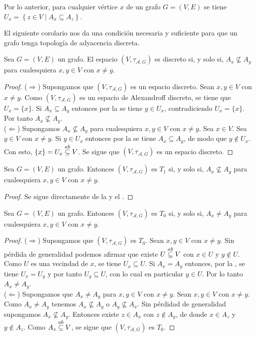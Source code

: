 \begin{Obs}\label{Obs:U_x}
   Por lo anterior, para cualquier vértice $x$ de un grafo $G=(V,E)$ se tiene $U_x=\left\lbrace z\in V\mid A_x\subseteq A_z\right\rbrace$.
\end{Obs}
El siguiente corolario nos da una condición necesaria y suficiente para que un grafo tenga topología de adyacencia discreta.
\begin{Cor}\label{Cor:Discreto_Alexandroff}
   Sea $G=(V,E)$ un grafo. El espacio $(V,\tau_{\mathcal{A},G})$ es discreto si, y solo si, $A_x \nsubseteq A_y$ para cualesquiera $x,y\in V$ con $x\ne y$.
\end{Cor}
\begin{proof}
   ($\Rightarrow$) Supongamos que $(V,\tau_{\mathcal{A},G})$ es un espacio discreto. Sean $x,y\in V$ con $x\ne y$. Como $(V, \tau_{\mathcal{A},G})$ es un espacio de Alexandroff discreto, se tiene que $U_x=\{x\}$. Si $A_x\subseteq A_y$ entonces por la  se tiene $y\in U_x$, contradiciendo $U_x=\{x\}$. Por tanto $A_x\nsubseteq A_y$.\\
   ($\Leftarrow$) Supongamos $A_x\nsubseteq A_y$ para cualesquiera $x,y\in V$ con $x\ne y$. Sea $x\in V$. Sea $y\in V$ con $x\ne y$. Si $y\in U_x$ entonces por la  se tiene $A_x\subseteq A_y$, de modo que $y\notin U_x$. Con esto, $\{x\}=U_x\stackrel{ab}{\subseteq} V$. Se sigue que $(V,\tau_{\mathcal{A},G})$ es un espacio discreto.  
\end{proof}
\begin{Cor}
   Sea $G=(V,E)$ un grafo. Entonces $(V,\tau_{\mathcal{A},G})$ es $T_1$ si, y solo si, $A_x\nsubseteq A_y$ para cualesquiera $x,y\in V$ con $x\ne y$.
\end{Cor}
\begin{proof}
   Se sigue directamente de la  y el .
\end{proof}
\begin{Cor}\label{Cor:T_0_Adyacencia}
   Sea $G=(V,E)$ un grafo. Entonces $(V,\tau_{\mathcal{A},G})$ es $T_0$ si, y solo si, $A_x\ne A_y$ para cualesquiera $x,y\in V$ con $x\ne y$.
\end{Cor}
\begin{proof}
   ($\Rightarrow$) Supongamos que $(V,\tau_{\mathcal{A},G})$ es $T_0$. Sean $x,y\in V$ con $x\ne y$. Sin pérdida de generalidad podemos afirmar que existe $U\stackrel{ab}{\subseteq} V$ con $x\in U$ y $y\notin U$. Como $U$ es una vecindad de $x$, se tiene $U_x\subseteq U$. Si $A_x=A_y$ entonces, por la , se tiene $U_x=U_y$ y por tanto $U_y\subseteq U$, con lo cual en particular $y\in U$. Por lo tanto $A_x\ne A_y$.\\
   ($\Leftarrow$) Supongamos que $A_x\ne A_y$ para $x,y\in V$ con $x\ne y$. Sean $x,y\in V$ con $x\ne y$. Como $A_x\ne A_y$ tenemos $A_x\nsubseteq A_y$ o $A_y\nsubseteq A_x$. Sin pérdidad de generalidad supongamos $A_x\nsubseteq A_y$. Entonces existe $z\in A_x$ con $z\notin A_y$, de donde $x\in A_z$ y $y\notin A_z$. Como $A_z\stackrel{ab}{\subseteq} V$, se sigue que $(V,\tau_{\mathcal{A},G})$ es $T_0$.
\end{proof}

